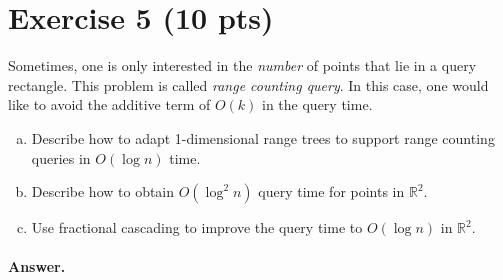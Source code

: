 \documentclass[a4paper]{article}
\newcommand{\RR}{\mathbb{R}}
\begin{document}
\section*{Exercise 5 (10 pts)}

Sometimes, one is only interested in the \emph{number} of points that lie in a query rectangle.
This problem is called \emph{range counting query}.
In this case, one would like to avoid the additive term of $O(k)$ in the query time.
\begin{enumerate}[a)]

\item Describe how to adapt 1-dimensional range trees to support range counting queries in $O(\log n)$ time.

\item Describe how to obtain $O(\log^2 n)$ query time for points in $\RR^2$.

\item Use fractional cascading to improve the query time to $O(\log n)$ in $\RR^2$.

\end{enumerate}

\paragraph{Answer.}
\end{document}
